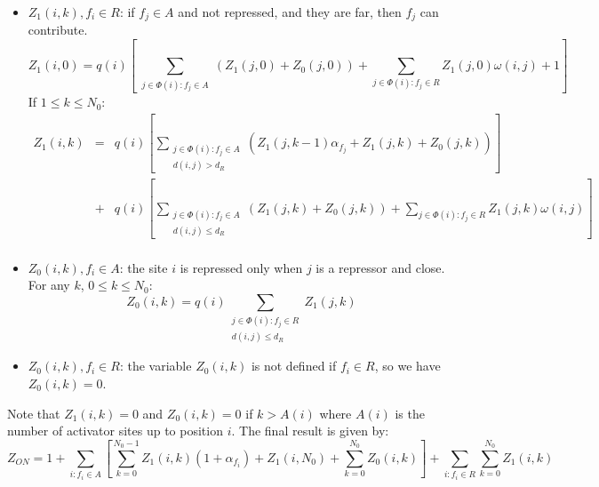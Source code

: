 \documentclass[11pt]{article}
\begin{document}
\begin{enumerate}
\begin{enumerate}
\begin{itemize}
\item $Z_1(i,k), f_i \in R$: if $f_j \in A$ and not repressed, and they are far, then $f_j$ can contribute. 
\begin{equation}
Z_1(i,0) = q(i) \left[ \sum_{\substack{j \in \Phi (i):f_j \in A}} (Z_1(j,0) + Z_0(j,0))+ \sum_{j \in \Phi (i):f_j \in R} Z_1(j,0) \omega(i,j) + 1 \right]
\end{equation}
If $1 \leq k \leq N_0$: 
\begin{equation}
\begin{array}{lll}
Z_1(i,k) & = & q(i) \left[ \sum_{\substack{j \in \Phi (i):f_j \in A\\ d(i,j) > d_R}} (Z_1(j,k-1) \alpha_{f_j} + Z_1(j,k) + Z_0(j,k)) \right]\\
 & + & q(i) \left[ \sum_{\substack{j \in \Phi (i):f_j \in A\\ d(i,j) \leq d_R}} (Z_1(j,k) + Z_0(j,k)) + \sum_{j \in \Phi (i):f_j \in R} Z_1(j,k) \omega(i,j) \right]\\
\end{array}
\end{equation}


\item $Z_0(i,k), f_i \in A$: the site $i$ is repressed only when $j$ is a repressor and close. For any $k$, $0 \leq k \leq N_0$: 
\begin{equation}
Z_0(i,k) = q(i) \sum_{\substack{j \in \Phi (i):f_j \in R\\d(i,j) \leq d_R}} Z_1(j,k)
\end{equation}

\item $Z_0(i,k), f_i \in R$: the variable $Z_0(i,k)$ is not defined if $f_i \in R$, so we have $Z_0(i,k) = 0$. 

\end{itemize}
Note that $Z_1(i,k) = 0$ and $Z_0(i,k) = 0$ if $k > A(i)$ where $A(i)$ is the number of activator sites up to position $i$. The final result is given by: 
\begin{equation}
Z_{ON} = 1 + \sum_{i:f_i \in A} \left[ \sum_{k=0}^{N_0-1}Z_1(i,k) (1+\alpha_{f_i}) + Z_1(i,N_0) + \sum_{k=0}^{N_0} Z_0(i,k) \right] + \sum_{i:f_i \in R} \sum_{k=0}^{N_0}Z_1(i,k)
\end{equation}


\end{enumerate}
\end{enumerate}
\end{document}
